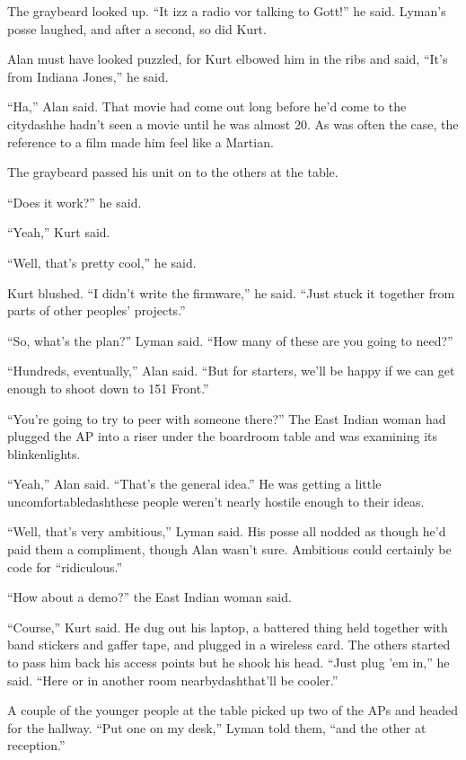 The graybeard looked up.  ``It izz a radio vor talking to Gott!'' he
said.  Lyman's posse laughed, and after a second, so did Kurt.

Alan must have looked puzzled, for Kurt elbowed him in the ribs and
said, ``It's from Indiana Jones,'' he said.

``Ha,'' Alan said.  That movie had come out long before he'd come to
the citydash{}he hadn't seen a movie until he was almost 20.  As was
often the case, the reference to a film made him feel like a Martian.

The graybeard passed his unit on to the others at the table.

``Does it work?'' he said.

``Yeah,'' Kurt said.

``Well, that's pretty cool,'' he said.

Kurt blushed.  ``I didn't write the firmware,'' he said.  ``Just stuck
it together from parts of other peoples' projects.''

``So, what's the plan?'' Lyman said.  ``How many of these are you
going to need?''

``Hundreds, eventually,'' Alan said.  ``But for starters, we'll be
happy if we can get enough to shoot down to 151 Front.''

``You're going to try to peer with someone there?'' The East Indian
woman had plugged the AP into a riser under the boardroom table and
was examining its blinkenlights.

``Yeah,'' Alan said.  ``That's the general idea.'' He was getting a
little uncomfortabledash{}these people weren't nearly hostile enough to
their ideas.

``Well, that's very ambitious,'' Lyman said.  His posse all nodded as
though he'd paid them a compliment, though Alan wasn't sure. 
Ambitious could certainly be code for ``ridiculous.''

``How about a demo?'' the East Indian woman said.

``Course,'' Kurt said.  He dug out his laptop, a battered thing held
together with band stickers and gaffer tape, and plugged in a wireless
card.  The others started to pass him back his access points but he
shook his head.  ``Just plug 'em in,'' he said.  ``Here or in another
room nearbydash{}that'll be cooler.''

A couple of the younger people at the table picked up two of the APs
and headed for the hallway.  ``Put one on my desk,'' Lyman told them,
``and the other at reception.''

